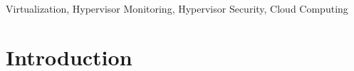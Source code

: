 ﻿\documentclass[conference]{IEEEtran}
\begin{document}
\begin{IEEEkeywords}
Virtualization, Hypervisor Monitoring, Hypervisor Security, Cloud Computing
\end{IEEEkeywords}

\section{Introduction}

%
%
%
%
\end{document}

